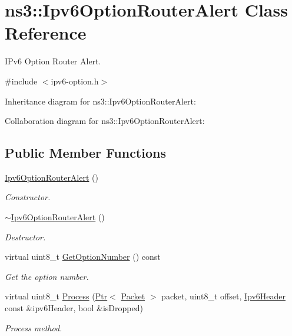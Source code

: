 \hypertarget{classns3_1_1Ipv6OptionRouterAlert}{}\section{ns3\+:\+:Ipv6\+Option\+Router\+Alert Class Reference}
\label{classns3_1_1Ipv6OptionRouterAlert}


I\+Pv6 Option Router Alert.  




{\ttfamily \#include $<$ipv6-\/option.\+h$>$}



Inheritance diagram for ns3\+:\+:Ipv6\+Option\+Router\+Alert\+:


Collaboration diagram for ns3\+:\+:Ipv6\+Option\+Router\+Alert\+:
\subsection*{Public Member Functions}
\begin{DoxyCompactItemize}
\item 
\hyperlink{classns3_1_1Ipv6OptionRouterAlert_a85a46148c5099c458bcc7806404feed3}{Ipv6\+Option\+Router\+Alert} ()
\begin{DoxyCompactList}\small\item\em Constructor. \end{DoxyCompactList}\item 
\hyperlink{classns3_1_1Ipv6OptionRouterAlert_ae2c7bd2fe1c2856332f56a9ec12f9e0c}{$\sim$\+Ipv6\+Option\+Router\+Alert} ()
\begin{DoxyCompactList}\small\item\em Destructor. \end{DoxyCompactList}\item 
virtual uint8\+\_\+t \hyperlink{classns3_1_1Ipv6OptionRouterAlert_a105066f87724792f625f0c27adb39fd3}{Get\+Option\+Number} () const 
\begin{DoxyCompactList}\small\item\em Get the option number. \end{DoxyCompactList}\item 
virtual uint8\+\_\+t \hyperlink{classns3_1_1Ipv6OptionRouterAlert_a630eeabe5af3c83790a43f3960f6eb22}{Process} (\hyperlink{classns3_1_1Ptr}{Ptr}$<$ \hyperlink{classns3_1_1Packet}{Packet} $>$ packet, uint8\+\_\+t offset, \hyperlink{classns3_1_1Ipv6Header}{Ipv6\+Header} const \&ipv6\+Header, bool \&is\+Dropped)
\begin{DoxyCompactList}\small\item\em Process method. \end{DoxyCompactList}\end{DoxyCompactItemize}
